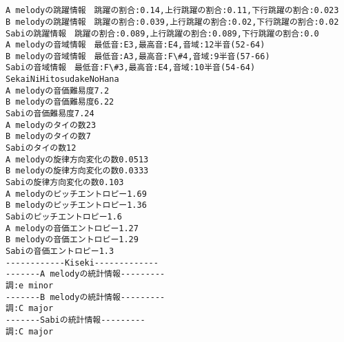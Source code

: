 \documentclass[11pt]{article}
\begin{document}
    \begin{center}
    \end{center}
    { \hspace*{\fill} \\}
    
    \begin{center}
    \end{center}
    { \hspace*{\fill} \\}
    
    \begin{Verbatim}[commandchars=\\\{\}]
A melodyの跳躍情報　跳躍の割合:0.14,上行跳躍の割合:0.11,下行跳躍の割合:0.023
B melodyの跳躍情報　跳躍の割合:0.039,上行跳躍の割合:0.02,下行跳躍の割合:0.02
Sabiの跳躍情報　跳躍の割合:0.089,上行跳躍の割合:0.089,下行跳躍の割合:0.0
A melodyの音域情報　最低音:E3,最高音:E4,音域:12半音(52-64)
B melodyの音域情報　最低音:A3,最高音:F\#4,音域:9半音(57-66)
Sabiの音域情報　最低音:F\#3,最高音:E4,音域:10半音(54-64)
SekaiNiHitosudakeNoHana
A melodyの音価難易度7.2
B melodyの音価難易度6.22
Sabiの音価難易度7.24
A melodyのタイの数23
B melodyのタイの数7
Sabiのタイの数12
A melodyの旋律方向変化の数0.0513
B melodyの旋律方向変化の数0.0333
Sabiの旋律方向変化の数0.103
A melodyのピッチエントロピー1.69
B melodyのピッチエントロピー1.36
Sabiのピッチエントロピー1.6
A melodyの音価エントロピー1.27
B melodyの音価エントロピー1.29
Sabiの音価エントロピー1.3
------------Kiseki-------------
-------A melodyの統計情報---------
調:e minor
-------B melodyの統計情報---------
調:C major
-------Sabiの統計情報---------
調:C major

    \end{Verbatim}

    \begin{center}
    \end{center}
    { \hspace*{\fill} \\}
    
    \begin{center}
    \end{center}
    { \hspace*{\fill} \\}
    
\end{document}
